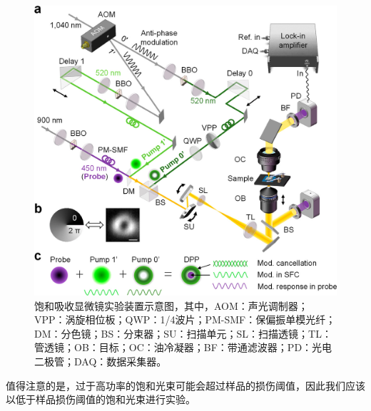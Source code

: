 \documentclass{phyasgn}\usepackage{nag}
\begin{document}
\begin{figure}[!h]
	\centering
	\includegraphics[width=.8\linewidth]{pic/3.png}
	\caption[饱和吸收显微镜原理]{饱和吸收显微镜实验装置示意图\cite{doi:10.1021/acs.nanolett.1c00403}，其中，AOM：声光调制器；VPP：涡旋相位板；QWP：1/4波片；PM-SMF：保偏振单模光纤；DM：分色镜；BS：分束器；SU：扫描单元；SL：扫描透镜；TL：管透镜；OB：目标；OC：油冷凝器；BF：带通滤波器；PD：光电二极管；DAQ：数据采集器。}\vspace{1ex}
	\label{3}
	\end{figure}
    \par 值得注意的是，过于高功率的饱和光束可能会超过样品的损伤阈值，因此我们应该以低于样品损伤阈值的饱和光束进行实验。
\end{document}
